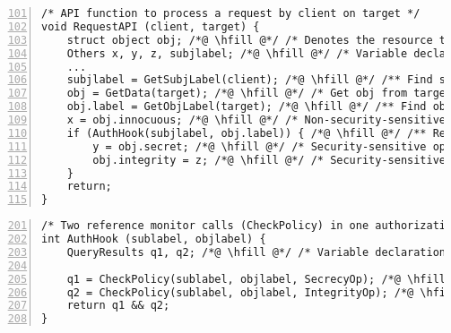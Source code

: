 \begin{figure*}[ht!]
%
\begin{center}
\newsavebox{\motivatingexample}
\begin{lrbox}{\motivatingexample}
\begin{minipage}[ht]{6.0in}
\begin{lstlisting}[numbers=left, firstnumber=101]
/* API function to process a request by client on target */
void RequestAPI (client, target) {
    struct object obj; /*@ \hfill @*/ /* Denotes the resource to protect accesses to */
    Others x, y, z, subjlabel; /*@ \hfill @*/ /* Variable declarations */
    ...
    subjlabel = GetSubjLabel(client); /*@ \hfill @*/ /** Find subject label for client */ /*@ \label{line:motivating-example:getsublabel} @*/
    obj = GetData(target); /*@ \hfill @*/ /* Get obj from target */
    obj.label = GetObjLabel(target); /*@ \hfill @*/ /** Find object label for target */ /*@ \label{line:motivating-example:getobjlabel} @*/
    x = obj.innocuous; /*@ \hfill @*/ /* Non-security-sensitive operation on obj */ /*@ \label{line:motivating-example:innocuous} @*/
    if (AuthHook(subjlabel, obj.label)) { /*@ \hfill @*/ /** Reference monitor call */ /*@ \label{line:motivating-example:authhook} @*/
        y = obj.secret; /*@ \hfill @*/ /* Security-sensitive operation to read secret data */ /*@ \label{line:motivating-example:secrecy} @*/
        obj.integrity = z; /*@ \hfill @*/ /* Security-sensitive operation to write data */ /*@ \label{line:motivating-example:integrity} @*/
    }
    return;
}
\end{lstlisting}

\begin{lstlisting}[numbers=left, firstnumber=201]
/* Two reference monitor calls (CheckPolicy) in one authorization query */
int AuthHook (sublabel, objlabel) {
    QueryResults q1, q2; /*@ \hfill @*/ /* Variable declarations */

    q1 = CheckPolicy(sublabel, objlabel, SecrecyOp); /*@ \hfill @*/ /** Query for line /*@\ref{line:motivating-example:secrecy}@*/ */ /*@ \label{line:motivating-example:secrecychk} @*/
    q2 = CheckPolicy(sublabel, objlabel, IntegrityOp); /*@ \hfill @*/ /** Query for line /*@\ref{line:motivating-example:integrity}@*/ */ /*@ \label{line:motivating-example:integritychk} @*/
    return q1 && q2; 
}
\end{lstlisting}
\end{minipage}
\end{lrbox}\fbox{\usebox{\motivatingexample}}
\end{center}
%
{\label{figure:introduction:motivating-example}}
\end{figure*}

